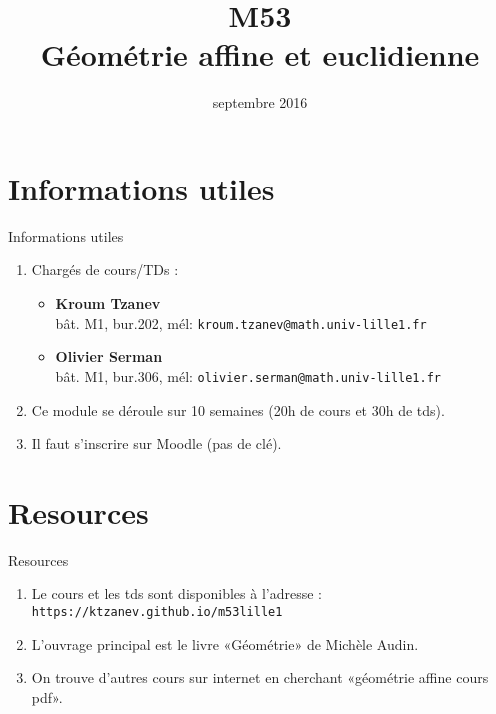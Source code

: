 \documentclass{m53beamer}
\title{M53\\Géométrie affine et euclidienne}
\date{septembre 2016}
\begin{document}
\begin{frame}
  \titlepage
\end{frame}

\section{Informations utiles}
\begin{frame}{Informations utiles}
  \begin{enumerate}[<+(1)->]
    \item Chargés de cours/TDs :
          \begin{itemize}
            \item \textbf{Kroum Tzanev}\\
              bât. M1, bur.202, mél: \texttt{kroum.tzanev@math.univ-lille1.fr}
            \item \textbf{Olivier Serman}\\
              bât. M1, bur.306, mél: \texttt{olivier.serman@math.univ-lille1.fr}
          \end{itemize}
    \item Ce module se déroule sur 10 semaines (20h de cours et 30h de tds).
    \item Il faut s'inscrire sur Moodle (pas de clé).
  \end{enumerate}
\end{frame}

\section{Resources}
\begin{frame}{Resources}
  \begin{enumerate}[<+(1)->]
    \item Le cours et les tds sont disponibles à l'adresse :
      \texttt{https://ktzanev.github.io/m53lille1}
    \item L'ouvrage principal est le livre «Géométrie» de Michèle Audin.
    \item On trouve d'autres cours sur internet en cherchant «géométrie affine cours pdf».
  \end{enumerate}
\end{frame}

\end{document}

